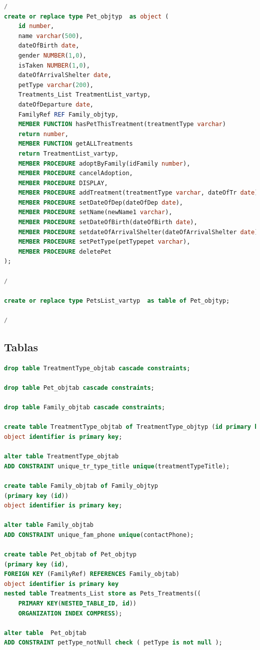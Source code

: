 \documentclass{FR16}
\begin{document}
\begin{lstlisting}[language=Sql, basicstyle=\scriptsize]
/
create or replace type Pet_objtyp  as object (
    id number,
    name varchar(500),
    dateOfBirth date,
    gender NUMBER(1,0),
    isTaken NUMBER(1,0),
    dateOfArrivalShelter date,
    petType varchar(200),
    Treatments_List TreatmentList_vartyp,
    dateOfDeparture date,
    FamilyRef REF Family_objtyp,
    MEMBER FUNCTION hasPetThisTreatment(treatmentType varchar)    
    return number,
    MEMBER FUNCTION getALLTreatments                              
    return TreatmentList_vartyp,
    MEMBER PROCEDURE adoptByFamily(idFamily number),
    MEMBER PROCEDURE cancelAdoption,
    MEMBER PROCEDURE DISPLAY,
    MEMBER PROCEDURE addTreatment(treatmentType varchar, dateOfTr date),
    MEMBER PROCEDURE setDateOfDep(dateOfDep date),
    MEMBER PROCEDURE setName(newName1 varchar),
    MEMBER PROCEDURE setDateOfBirth(dateOfBirth date),
    MEMBER PROCEDURE setdateOfArrivalShelter(dateOfArrivalShelter date),
    MEMBER PROCEDURE setPetType(petTypepet varchar),
    MEMBER PROCEDURE deletePet
);

/

create or replace type PetsList_vartyp  as table of Pet_objtyp;

/
\end{lstlisting}
\newpage

\subsection{Tablas}
\begin{lstlisting}[language=Sql, basicstyle=\scriptsize]
drop table TreatmentType_objtab cascade constraints;

drop table Pet_objtab cascade constraints;

drop table Family_objtab cascade constraints;

create table TreatmentType_objtab of TreatmentType_objtyp (id primary key) 
object identifier is primary key;

alter table TreatmentType_objtab
ADD CONSTRAINT unique_tr_type_title unique(treatmentTypeTitle);

create table Family_objtab of Family_objtyp
(primary key (id))
object identifier is primary key;

alter table Family_objtab
ADD CONSTRAINT unique_fam_phone unique(contactPhone);

create table Pet_objtab of Pet_objtyp 
(primary key (id),
FOREIGN KEY (FamilyRef) REFERENCES Family_objtab)
object identifier is primary key
nested table Treatments_List store as Pets_Treatments((
    PRIMARY KEY(NESTED_TABLE_ID, id))
    ORGANIZATION INDEX COMPRESS);

alter table  Pet_objtab 
ADD CONSTRAINT petType_notNull check ( petType is not null );
\end{lstlisting}
\newpage
\end{document}
